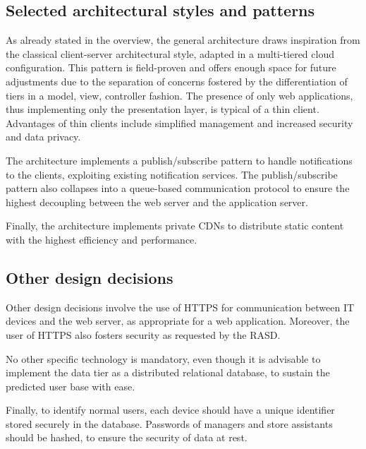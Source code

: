 \documentclass[../../main.tex]{subfiles}
\begin{document}
\subsection{Selected architectural styles and patterns}

    As already stated in the overview, the general architecture draws inspiration from the classical client-server architectural style, adapted in a multi-tiered cloud configuration.  
    This pattern is field-proven and offers enough space for future adjustments due to the separation of concerns fostered by the differentiation of tiers in a model, view, controller fashion.
    The presence of only web applications, thus implementing only the presentation layer, is typical of a thin client. Advantages of thin clients include simplified management and 
    increased security and data privacy.

    The architecture implements a publish/subscribe pattern to handle notifications to the clients, exploiting existing notification services. 
    The publish/subscribe pattern also collapses into a queue-based communication protocol to ensure the highest decoupling between the web server and the application server.

    Finally, the architecture implements private CDNs to distribute static content with the highest efficiency and performance.


\subsection{Other design decisions}

    Other design decisions involve the use of HTTPS for communication between IT devices and the web server, as appropriate for a web application. Moreover, 
    the user of HTTPS also fosters security as requested by the RASD.

    No other specific technology is mandatory, even though it is advisable to implement the data tier as a distributed relational database, to sustain the predicted user base with ease.

    Finally, to identify normal users, each device should have a unique identifier stored securely in the database. 
    Passwords of managers and store assistants should be hashed, to ensure the security of data at rest.
\end{document}
